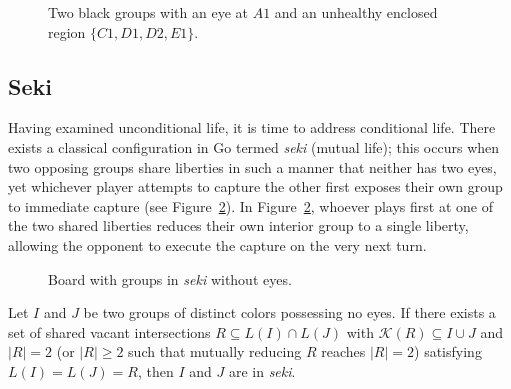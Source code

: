 \begin{figure}[H]
	\centering
	\begin{goban}[7, hoshi = false,label = {at = {south, west}}]
	\end{goban}
	\caption{Two black groups with an \textcolor{sealred}{eye} at $A1$ and an unhealthy enclosed region $\{C1, D1, D2, E1\}$.}
	\label{fig:ej_vidas}
\end{figure}

\subsection{Seki}

Having examined unconditional life, it is time to address conditional life. There exists a classical configuration in Go termed \textit{seki} (mutual life); this occurs when two opposing groups share liberties in such a manner that neither has two eyes, yet whichever player attempts to capture the other first exposes their own group to immediate capture (see Figure~\ref{fig:seki}). In Figure~\ref{fig:seki}, whoever plays first at one of the two shared \textcolor{Moss}{liberties} reduces their own interior group to a single liberty, allowing the opponent to execute the capture on the very next turn.

\begin{figure}[H]
	\centering
	\begin{goban}[7, hoshi = false]
	\end{goban}
	\caption{Board with groups in \textit{seki} without eyes.}
	\label{fig:seki}
\end{figure}

\begin{definition}\label{def:seki_no_eyes}
	Let $I$ and $J$ be two groups of distinct colors possessing no eyes. If there
	exists a set of shared vacant intersections $R \subseteq L(I) \cap L(J)$ with
	$\mathcal{K}(R) \subseteq I \cup J$ and $|R| = 2$ (or $|R| \ge 2$ such that
	mutually reducing $R$ reaches $|R| = 2$) satisfying $L(I) = L(J) = R$, then
	$I$ and $J$ are in \emph{seki}.
\end{definition}

